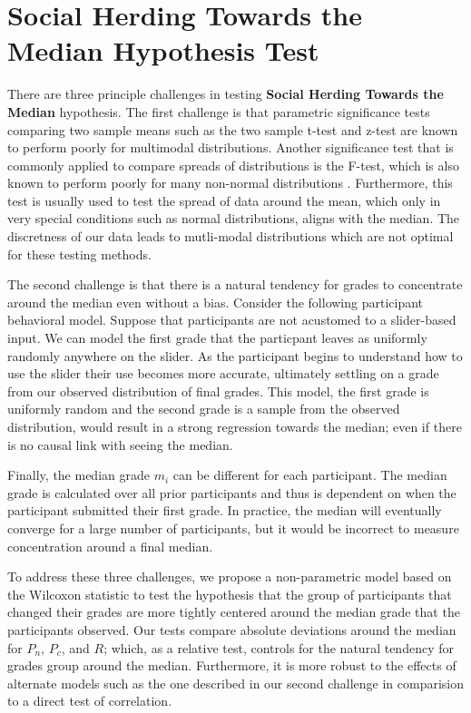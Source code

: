 \section{Social Herding Towards the Median Hypothesis Test}\label{ht}
There are three principle challenges in testing \textbf{Social Herding Towards the Median} hypothesis.
The first challenge is that parametric significance tests comparing two sample means such as the two sample t-test and z-test are known to 
perform poorly for multimodal distributions.
Another significance test that is commonly applied to compare spreads of distributions is the F-test, which is also known to perform poorly for many non-normal distributions \cite{markowski1990conditions}.
Furthermore, this test is usually used to test the spread of data around the mean, which only in very special conditions such as normal distributions, aligns with the median. 
The discretness of our data leads to mutli-modal distributions which are not optimal for these testing methods.

The second challenge is that there is a natural tendency for grades to concentrate around the median even without a bias.
Consider the following participant behavioral model.
Suppose that participants are not acustomed to a slider-based input.
We can model the first grade that the particpant leaves as uniformly randomly anywhere on the slider.
As the participant begins to understand how to use the slider their use becomes more accurate, ultimately settling on a grade from our observed distribution of final grades.
This model, the first grade is uniformly random and the second grade is a sample from the observed distribution, would result in a strong regression towards the median; even if there is no causal link with seeing the median.

Finally, the median grade $m_i$ can be different for each participant.
The median grade is calculated over all prior participants and thus is dependent on when the participant submitted their first grade.
In practice, the median will eventually converge for a large number of participants, but it would be incorrect to measure concentration around a final median.

To address these three challenges, we propose a non-parametric model based on the Wilcoxon statistic to test the hypothesis that the group of participants that changed their grades are more tightly centered around the median grade that the participants observed.
Our tests compare absolute deviations around the median for $P_n$, $P_c$, and $R$; which, as a relative test, controls for the natural tendency for grades group around the median.
Furthermore, it is more robust to the effects of alternate models such as the one described in our second challenge in comparision to a direct test of correlation.

